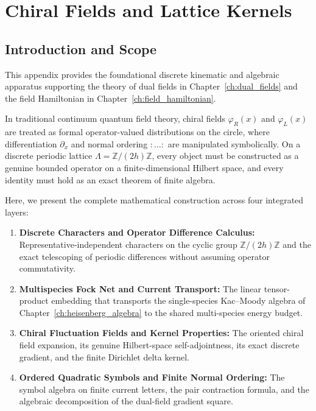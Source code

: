 \chapter{Chiral Fields and Lattice Kernels}
\label{app:chiral_fields}

\section{Introduction and Scope}

This appendix provides the foundational discrete kinematic and algebraic apparatus supporting the theory of dual fields in Chapter~\ref{ch:dual_fields} and the field Hamiltonian in Chapter~\ref{ch:field_hamiltonian}.

In traditional continuum quantum field theory, chiral fields $\varphi_R(x)$ and $\varphi_L(x)$ are treated as formal operator-valued distributions on the circle, where differentiation $\partial_x$ and normal ordering $:\!\dots\!:$ are manipulated symbolically. On a discrete periodic lattice $\Lambda = \mathbb{Z}/(2h)\mathbb{Z}$, every object must be constructed as a genuine bounded operator on a finite-dimensional Hilbert space, and every identity must hold as an exact theorem of finite algebra.

Here, we present the complete mathematical construction across four integrated layers:
\begin{enumerate}
    \item \textbf{Discrete Characters and Operator Difference Calculus:} Representative-independent characters on the cyclic group $\mathbb{Z}/(2h)\mathbb{Z}$ and the exact telescoping of periodic differences without assuming operator commutativity.
    \item \textbf{Multispecies Fock Net and Current Transport:} The linear tensor-product embedding that transports the single-species Kac--Moody algebra of Chapter~\ref{ch:heisenberg_algebra} to the shared multi-species energy budget.
    \item \textbf{Chiral Fluctuation Fields and Kernel Properties:} The oriented chiral field expansion, its genuine Hilbert-space self-adjointness, its exact discrete gradient, and the finite Dirichlet delta kernel.
    \item \textbf{Ordered Quadratic Symbols and Finite Normal Ordering:} The symbol algebra on finite current letters, the pair contraction formula, and the algebraic decomposition of the dual-field gradient square.
\end{enumerate}

